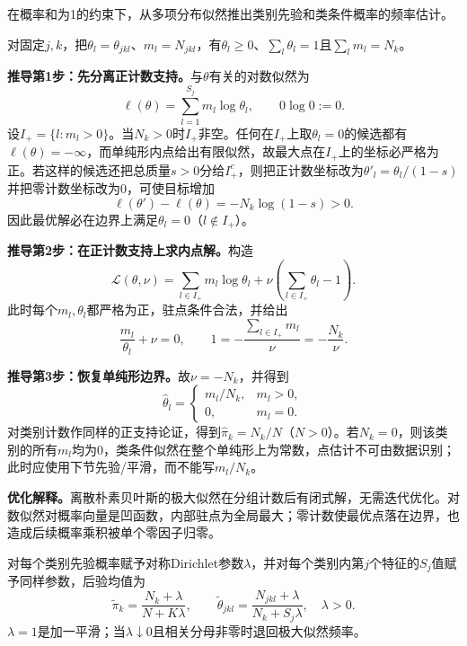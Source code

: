 \begin{derivationgoalbox}
在概率和为1的约束下，从多项分布似然推出类别先验和类条件概率的频率估计。
\end{derivationgoalbox}
\begin{derivationprepbox}
对固定$j,k$，把$\theta_l=\theta_{jkl}$、$m_l=N_{jkl}$，有$\theta_l\ge0$、$\sum_l\theta_l=1$且$\sum_lm_l=N_k$。
\end{derivationprepbox}
\textbf{推导第1步：先分离正计数支持。}与$\theta$有关的对数似然为
\[
\ell(\theta)=\sum_{l=1}^{S_j}m_l\log\theta_l,
\qquad 0\log0:=0.
\]
设$I_+=\{l:m_l>0\}$。当$N_k>0$时$I_+$非空。任何在$I_+$上取$\theta_l=0$的候选都有$\ell(\theta)=-\infty$，而单纯形内点给出有限似然，故最大点在$I_+$上的坐标必严格为正。若这样的候选还把总质量$s>0$分给$I_+^c$，则把正计数坐标改为$\theta'_l=\theta_l/(1-s)$并把零计数坐标改为$0$，可使目标增加
\[
\ell(\theta')-\ell(\theta)=-N_k\log(1-s)>0.
\]
因此最优解必在边界上满足$\theta_l=0$（$l\notin I_+$）。

\textbf{推导第2步：在正计数支持上求内点解。}构造
\[
\mathcal L(\theta,\nu)
=\sum_{l\in I_+}m_l\log\theta_l
+\nu\left(\sum_{l\in I_+}\theta_l-1\right).
\]
此时每个$m_l,\theta_l$都严格为正，驻点条件合法，并给出
\[
\frac{m_l}{\theta_l}+\nu=0,
\qquad
1=-\frac{\sum_{l\in I_+}m_l}{\nu}
=-\frac{N_k}{\nu}.
\]

\textbf{推导第3步：恢复单纯形边界。}故$\nu=-N_k$，并得到
\[
\widehat\theta_l=
\begin{cases}
m_l/N_k,&m_l>0,\\
0,&m_l=0.
\end{cases}
\]
对类别计数作同样的正支持论证，得到$\widehat\pi_k=N_k/N$（$N>0$）。若$N_k=0$，则该类别的所有$m_l$均为0，类条件似然在整个单纯形上为常数，点估计不可由数据识别；此时应使用下节先验/平滑，而不能写$m_l/N_k$。

\label{struct:V2-C03-CH16}
\begin{optimizationbox}
\textbf{优化解释。}离散朴素贝叶斯的极大似然在分组计数后有闭式解，无需迭代优化。对数似然对概率向量是凹函数，内部驻点为全局最大；零计数使最优点落在边界，也造成后续概率乘积被单个零因子归零。
\end{optimizationbox}


对每个类别先验概率赋予对称Dirichlet参数$\lambda$，并对每个类别内第$j$个特征的$S_j$值赋予同样参数，后验均值为
\[
\widetilde\pi_k=\frac{N_k+\lambda}{N+K\lambda},\qquad
\widetilde\theta_{jkl}=\frac{N_{jkl}+\lambda}{N_k+S_j\lambda},
\quad \lambda>0.
\]
$\lambda=1$是加一平滑；当$\lambda\downarrow0$且相关分母非零时退回极大似然频率。

